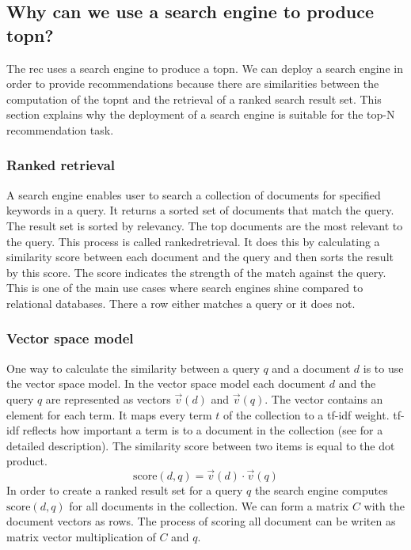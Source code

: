 \subsection{Why can we use a search engine to produce \gls{topn}?}
\label{sec:relation}

The \gls{rec} uses a search engine to produce a \gls{topn}. We can deploy a search engine in order to provide recommendations because there are similarities between the computation of the \gls{topnt} and the retrieval of a ranked search result set.
 This section explains why the deployment of a search engine is suitable for the top-N recommendation task.

\subsubsection{Ranked retrieval}
A search engine enables user to search a collection of documents for specified keywords in a query. It returns a sorted set of documents that match the query. The result set is sorted by relevancy. The top documents are the most relevant to the query. This process is called \gls{rankedretrieval}. It does this by calculating a similarity score between each document and the query and then sorts the result by this score. The score indicates the strength of the match against the query. This is one of the main use cases where search engines shine compared to relational databases. There a row either matches a query or it does not. 

\subsubsection{Vector space model}
One way to calculate the similarity between a query $q$ and a document $d$ is to use the vector space model.
In the vector space model each document $d$ and the query $q$ are represented as vectors $\vec{v}(d)$ and $\vec{v}(q)$. The vector contains an element for each term. It maps every term $t$ of the collection to a tf-idf weight. tf-idf reflects how important a term is to a document in the collection (see \cite{Manning} for a detailed description). 
The similarity score between two items is equal to the dot product.
\begin{equation}
  \label{eq:score}
  \text{score}(d,q) = \vec{v}(d) \cdot \vec{v}(q)
\end{equation}
In order to create a ranked result set for a query $q$ the search engine computes $\text{score}(d,q)$ for all documents in the collection. We can form a matrix $C$ with the document vectors as rows. The process of scoring all document can be writen as matrix vector multiplication of $C$ and $q$. 

